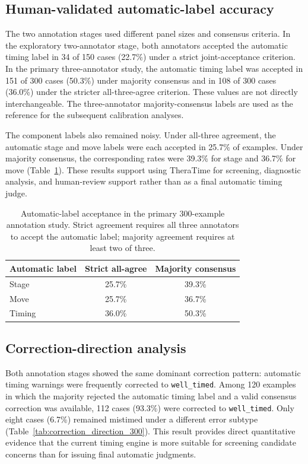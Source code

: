 \documentclass[preprint,12pt,a4paper]{elsarticle}
\begin{document}
\subsection{Human-validated automatic-label accuracy}

The two annotation stages used different panel sizes and consensus criteria. In the exploratory two-annotator stage, both annotators accepted the automatic timing label in 34 of 150 cases (22.7\%) under a strict joint-acceptance criterion. In the primary three-annotator study, the automatic timing label was accepted in 151 of 300 cases (50.3\%) under majority consensus and in 108 of 300 cases (36.0\%) under the stricter all-three-agree criterion. These values are not directly interchangeable. The three-annotator majority-consensus labels are used as the reference for the subsequent calibration analyses.

The component labels also remained noisy. Under all-three agreement, the automatic stage and move labels were each accepted in 25.7\% of examples. Under majority consensus, the corresponding rates were 39.3\% for stage and 36.7\% for move (Table~\ref{tab:auto_label_accuracy_300}). These results support using TheraTime for screening, diagnostic analysis, and human-review support rather than as a final automatic timing judge.

\begin{table}[!htbp]
\centering
\caption{Automatic-label acceptance in the primary 300-example annotation study. Strict agreement requires all three annotators to accept the automatic label; majority agreement requires at least two of three.}
\label{tab:auto_label_accuracy_300}
\small
{}
\begin{tabular}{lcc}
\toprule
\textbf{Automatic label} &
\textbf{Strict all-agree} &
\textbf{Majority consensus} \\
\midrule
Stage  & 25.7\% & 39.3\% \\
Move   & 25.7\% & 36.7\% \\
Timing & 36.0\% & 50.3\% \\
\bottomrule
\end{tabular}
\end{table}

\subsection{Correction-direction analysis}

Both annotation stages showed the same dominant correction pattern: automatic timing warnings were frequently corrected to \texttt{well\_timed}. Among 120 examples in which the majority rejected the automatic timing label and a valid consensus correction was available, 112 cases (93.3\%) were corrected to \texttt{well\_timed}. Only eight cases (6.7\%) remained mistimed under a different error subtype (Table~\ref{tab:correction_direction_300}). This result provides direct quantitative evidence that the current timing engine is more suitable for screening candidate concerns than for issuing final automatic judgments.
\end{document}
